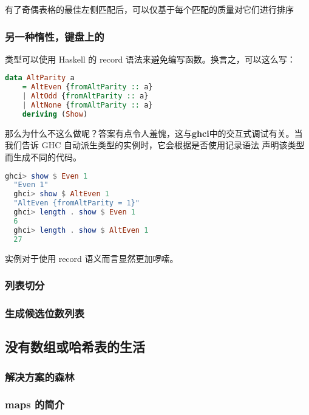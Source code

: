 \documentclass[./main.tex]{subfiles}
\begin{document}
有了奇偶表格的最佳左侧匹配后，可以仅基于每个匹配的质量对它们进行排序

\subsubsection*{另一种惰性，键盘上的}

类型可以使用 Haskell 的 record 语法来避免编写函数。换言之，可以这么写：

\begin{lstlisting}[language=Haskell]
  data AltParity a
    = AltEven {fromAltParity :: a}
    | AltOdd {fromAltParity :: a}
    | AltNone {fromAltParity :: a}
    deriving (Show)
\end{lstlisting}

那么为什么不这么做呢？答案有点令人羞愧，这与\textbf{ghci}中的交互式调试有关。当我们告诉 GHC 自动派生类型的实例时，它会根据是否使用记录语法
声明该类型而生成不同的代码。

\begin{lstlisting}[language=Haskell]
  ghci> show $ Even 1
  "Even 1"
  ghci> show $ AltEven 1
  "AltEven {fromAltParity = 1}"
  ghci> length . show $ Even 1
  6
  ghci> length . show $ AltEven 1
  27
\end{lstlisting}

实例对于使用 record 语义而言显然更加啰嗦。

\subsubsection*{列表切分}

\subsubsection*{生成候选位数列表}

\subsection*{没有数组或哈希表的生活}

\subsubsection*{解决方案的森林}

\subsubsection*{maps 的简介}
\end{document}
